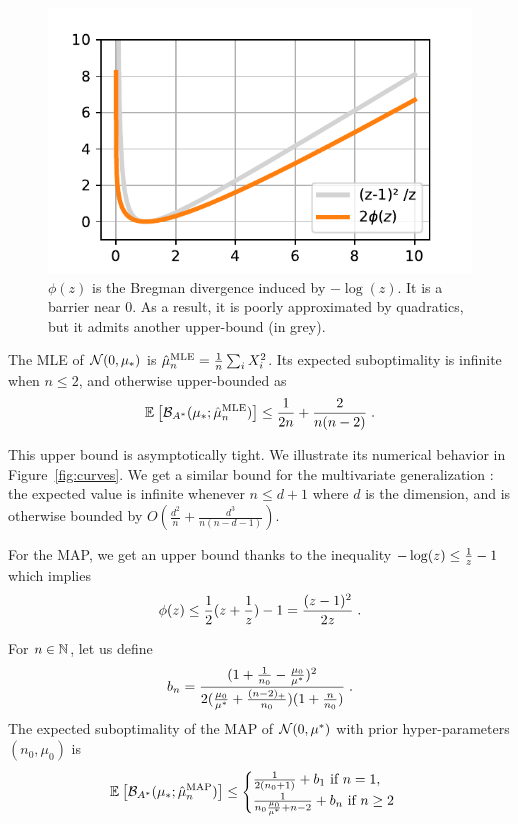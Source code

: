 \documentclass[twoside]{article}
\newcommand*{\expect}[2][]{\ensuremath{\mathbb{E}_{#1} \left[ #2 \right] }} %
\newcommand{\logpart}{A}
\newcommand{\bregmanconj}{\cB_{\logpart^*}}
\newcommand{\m}{\mu}
\begin{document}
\begin{figure}[ht]
	\centering
	\includegraphics[width=.4\textwidth]{phi.pdf}
	\caption{$\phi(z)$ is the Bregman divergence induced by $-\log(z)$. It is a barrier near $0$. As a result, it is poorly approximated by quadratics, but it admits another upper-bound (in grey).}
	\label{fig:phi}
\end{figure}


\begin{theorem}
	The MLE of $\cN(0,\m_*)$ is $\hat \m_n^\text{MLE} = \inv{n} \sum_i X_i^2 $.
	Its expected suboptimality is infinite when $n\leq 2$, and otherwise upper-bounded as
	\begin{align}
		 \expect{\bregmanconj( \m_*; \hat \m_n^\text{MLE}) }
			\leq \inv{2n} +\frac{2}{n(n-2)} \; .
			\label{eq:MLE_rate}
	\end{align}
\end{theorem}

This upper bound is asymptotically tight.
We illustrate its numerical behavior in Figure~\ref{fig:curves}.
We get a similar bound for the multivariate generalization :
the expected value is infinite whenever $n \leq d+1$ where $d$ is the dimension, and is otherwise bounded by $O(\frac{d^2}{n} + \frac{d^3}{n(n-d-1)} )$.

For the MAP, we get an upper bound thanks to the inequality $ - \log(z) \leq \frac{1}{z} - 1$ which implies
\begin{align}
	\label{eq:log_bound}
	\phi(z) \leq \frac{1}{2} (z + \frac{1}{z}) - 1 = \frac{(z-1)^2}{2 z} \; .
\end{align}

\begin{theorem}
 For $n\in \mathbb{N}$, let us  define
 \begin{align}
	b_n = \frac{(1 + \inv{n_0} - \frac{\m_0}{\m^*})^2}{2 (\frac{\m_0}{\m^*}+\frac{(n-2)_+}{n_0})(1 + \frac{n}{n_0} )} \; .
 \end{align}
The expected suboptimality of the MAP of $\cN(0,\m^*)$ with prior hyper-parameters $(n_0,\m_0)$ is
 \begin{equation}
	\expect{\bregmanconj( \m_*; \hat \m_n^\mathrm{MAP})}
	\leq \begin{cases}
		\inv{2(n_0+1)}  +  b_1 \ \text{if}\ n=1,\\
		\frac{1}{n_0 \frac{\m_0}{\m^*} +n-2} + b_n \ \text{if}\ n\geq 2
	\end{cases}
	\label{eq:MAP_rate}
\end{equation}
\end{theorem}
\end{document}
